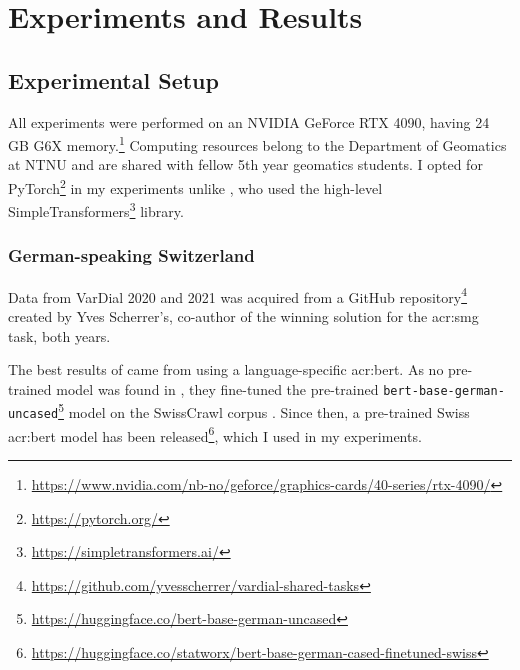 \section{Experiments and Results}
\label{sec:Experiments}

\begin{comment}
Trying and failing is a major part of research.
However, to have a chance of success you need a plan driving the experimental research.
So first decide what experiments or series of experiments you plan --- and describe them in this section.
\end{comment}

\subsection{Experimental Setup}
\label{sec:experimentalSetup}


All experiments were performed on an NVIDIA GeForce RTX 4090, having 24 GB G6X memory.\footnote{\url{https://www.nvidia.com/nb-no/geforce/graphics-cards/40-series/rtx-4090/}} Computing resources belong to the Department of Geomatics at NTNU and are shared with fellow 5th year geomatics students. I opted for PyTorch\footnote{\url{https://pytorch.org/}} in my experiments unlike \cite{scherrerHeLjuVarDial20202020}, who used the high-level SimpleTransformers\footnote{\url{https://simpletransformers.ai/}} library.

\subsubsection{German-speaking Switzerland}

Data from VarDial 2020 and 2021 was acquired from a GitHub repository\footnote{\url{https://github.com/yvesscherrer/vardial-shared-tasks}} created by Yves Scherrer's, co-author of the winning solution for the \gls{acr:smg} task, both years.

The best results of \cite{scherrerHeLjuVarDial20202020} came from using a language-specific \acrshort{acr:bert}. As no pre-trained model was found in \citeyear{scherrerHeLjuVarDial20202020}, they fine-tuned the pre-trained \texttt{bert-base-german-uncased}\footnote{\url{https://huggingface.co/bert-base-german-uncased}} model on the SwissCrawl corpus \citep[3-4]{scherrerHeLjuVarDial20202020}. Since then, a pre-trained Swiss \acrshort{acr:bert} model has been released\footnote{\url{https://huggingface.co/statworx/bert-base-german-cased-finetuned-swiss}}, which I used in my experiments.

